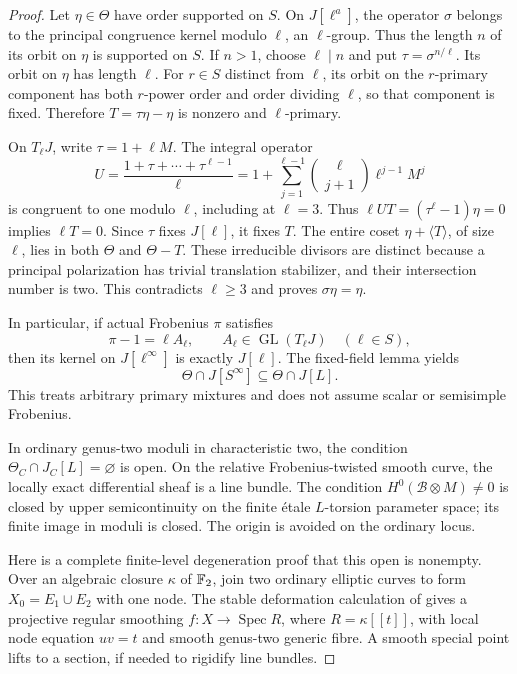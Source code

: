 \begin{proof}
Let $\eta\in\Theta$ have order supported on $S$. On
$J[\ell^a]$, the operator $\sigma$ belongs to the principal
congruence kernel modulo $\ell$, an $\ell$-group.
Thus the length $n$ of its orbit on $\eta$ is supported on $S$.
If $n>1$, choose $\ell\mid n$ and put $\tau=\sigma^{n/\ell}$.
Its orbit on $\eta$ has length $\ell$. For $r\in S$ distinct
from $\ell$, its orbit on the $r$-primary component has both
$r$-power order and order dividing $\ell$, so that component
is fixed. Therefore $T=\tau\eta-\eta$ is nonzero and
$\ell$-primary.

On $T_\ell J$, write $\tau=1+\ell M$. The integral operator
\[
 U=\frac{1+\tau+\cdots+\tau^{\ell-1}}\ell
   =1+\sum_{j=1}^{\ell-1}
       \binom{\ell}{j+1}\ell^{j-1}M^j
\]
is congruent to one modulo $\ell$, including at $\ell=3$.
Thus $\ell UT=(\tau^\ell-1)\eta=0$ implies $\ell T=0$.
Since $\tau$ fixes $J[\ell]$, it fixes $T$. The entire coset
$\eta+\langle T\rangle$, of size $\ell$, lies in both
$\Theta$ and $\Theta-T$. These irreducible divisors are
distinct because a principal polarization has trivial
translation stabilizer, and their intersection number is two.
This contradicts $\ell\ge3$ and proves $\sigma\eta=\eta$.

In particular, if actual Frobenius $\pi$ satisfies
\[
 \pi-1=\ell A_\ell,\qquad
 A_\ell\in\operatorname{GL}(T_\ell J)\quad(\ell\in S),             \tag{C2.36}
\]
then its kernel on $J[\ell^\infty]$ is exactly $J[\ell]$.
The fixed-field lemma yields
\[
            \Theta\cap J[S^\infty]\subseteq\Theta\cap J[L].
                                                                    \tag{C2.37}
\]
This treats arbitrary primary mixtures and does not assume
scalar or semisimple Frobenius.

In ordinary genus-two moduli in characteristic two, the
condition $\Theta_C\cap J_C[L]=\varnothing$ is open.
On the relative Frobenius-twisted smooth curve, the locally
exact differential sheaf is a line bundle. The condition
$H^0(\mathcal B\otimes M)\ne0$ is closed by upper
semicontinuity on the finite \'etale $L$-torsion parameter
space; its finite image in moduli is closed. The origin is
avoided on the ordinary locus.

Here is a complete finite-level degeneration proof that this
open is nonempty. Over an algebraic closure $\kappa$ of $\mathbb F_2$,
join two ordinary elliptic curves to form $X_0=E_1\cup E_2$
with one node. The stable deformation calculation of
\citet[Proposition 1.5, its algebraization paragraph, and
Theorem 1.6, pp.81--83]{A_DeligneMumford1969} gives a projective
regular smoothing $f:X\to\operatorname{Spec}R$, where
$R=\kappa[[t]]$, with local node equation $uv=t$ and smooth
genus-two generic fibre. A smooth special point lifts to a
section, if needed to rigidify line bundles.


\end{proof}
